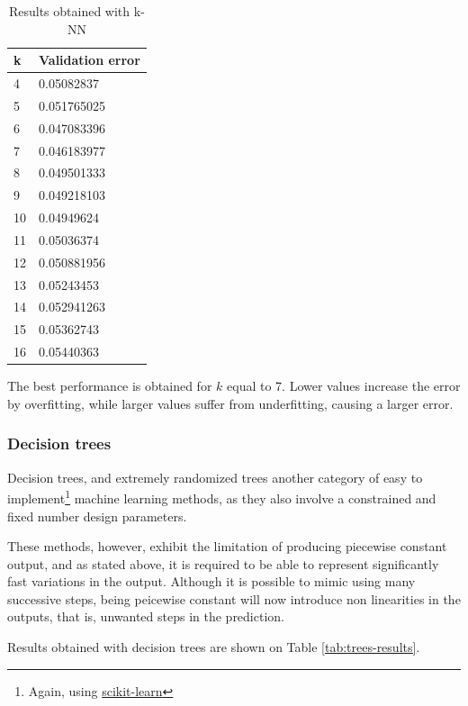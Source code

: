 \begin{table}[h]
    \centering
    \begin{tabular}{|l|l|}
        \hline
        k & Validation error \\ \hline
        4  & 0.05082837 \\
        5  & 0.051765025 \\
        6  & 0.047083396 \\
        7  & 0.046183977 \\
        8  & 0.049501333 \\
        9  & 0.049218103 \\
        10 & 0.04949624 \\
        11 & 0.05036374 \\
        12 & 0.050881956 \\
        13 & 0.05243453 \\
        14 & 0.052941263 \\
        15 & 0.05362743 \\
        16 & 0.05440363 \\ \hline
    \end{tabular}
    \caption{Results obtained with k-NN}
    \label{tab:results-knn}
\end{table}

The best performance is obtained for $k$ equal to 7. Lower values increase the error by overfitting, while larger values suffer from underfitting, causing a larger error.

\subsubsection{Decision trees}

Decision trees, and extremely randomized trees \cite{extremely-randomized-trees} another category of easy to implement\footnote{Again, using \href{https://scikit-learn.org/stable/modules/ensemble.html\#forests-of-randomized-trees}{scikit-learn}} machine learning methods, as they also involve a constrained and fixed number design parameters.

 These methods, however, exhibit the limitation of producing piecewise constant output, and as stated above, it is required to be able to represent significantly fast variations in the output. Although it is possible to mimic using many successive steps, being peicewise constant will now introduce non linearities in the outputs, that is, unwanted steps in the prediction.

Results obtained with decision trees are shown on Table \ref{tab:trees-results}.

